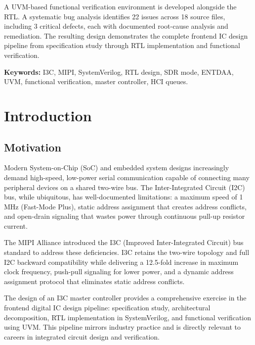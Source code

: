 \documentclass[12pt, a4paper, oneside]{report}
\begin{document}
A UVM-based functional verification environment is developed alongside the RTL. A
systematic bug analysis identifies 22 issues across 18 source files, including 3 critical
defects, each with documented root-cause analysis and remediation. The resulting design
demonstrates the complete frontend IC design pipeline from specification study through RTL
implementation and functional verification.

\vspace{1.5em}
\noindent\textbf{Keywords:} I3C, MIPI, SystemVerilog, RTL design, SDR mode, ENTDAA, UVM,
functional verification, master controller, HCI queues.

\tableofcontents

\listoffigures
\listoftables

\cleardoublepage
{}

\chapter{Introduction}

\section{Motivation}

Modern System-on-Chip (SoC) and embedded system designs increasingly demand high-speed,
low-power serial communication capable of connecting many peripheral devices on a shared
two-wire bus. The Inter-Integrated Circuit (I2C) bus, while ubiquitous, has
well-documented limitations: a maximum speed of 1\,MHz (Fast-Mode Plus), static address
assignment that creates address conflicts, and open-drain signaling that wastes power
through continuous pull-up resistor current.

The MIPI Alliance introduced the I3C (Improved Inter-Integrated Circuit) bus standard to
address these deficiencies. I3C retains the two-wire topology and full I2C backward
compatibility while delivering a 12.5-fold increase in maximum clock frequency,
push-pull signaling for lower power, and a dynamic address assignment protocol that
eliminates static address conflicts.

The design of an I3C master controller provides a comprehensive exercise in the frontend
digital IC design pipeline: specification study, architectural decomposition, RTL
implementation in SystemVerilog, and functional verification using UVM. This pipeline
mirrors industry practice and is directly relevant to careers in integrated circuit
design and verification.
\end{document}
